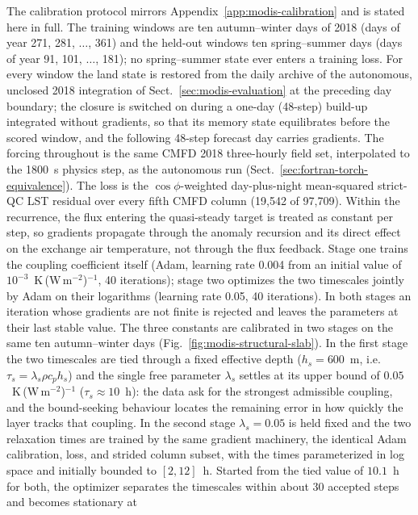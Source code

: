 The calibration protocol mirrors Appendix~\ref{app:modis-calibration} and
is stated here in full. The training windows are ten autumn--winter days of
2018 (days of year 271, 281, $\dots$, 361) and the held-out windows ten
spring--summer days (days of year 91, 101, $\dots$, 181); no
spring--summer state ever enters a training loss. For every window the land
state is restored from the daily archive of the autonomous, unclosed 2018
integration of Sect.~\ref{sec:modis-evaluation} at the preceding day
boundary; the closure is switched on during a one-day (48-step) build-up
integrated without gradients, so that its memory state equilibrates before
the scored window, and the following 48-step forecast day carries
gradients. The forcing throughout is the same CMFD 2018 three-hourly
field set, interpolated to the 1800~s physics step, as the autonomous run
(Sect.~\ref{sec:fortran-torch-equivalence}). The loss is the
$\cos\phi$-weighted day-plus-night mean-squared strict-QC LST residual over
every fifth CMFD column (19{,}542 of 97{,}709). Within the recurrence, the
flux entering the quasi-steady target is treated as constant per step, so
gradients propagate through the anomaly recursion and its direct effect on
the exchange air temperature, not through the flux feedback. Stage one
trains the coupling coefficient itself (Adam, learning rate 0.004 from an
initial value of $10^{-3}$~K\,(W\,m$^{-2}$)$^{-1}$, 40 iterations); stage
two optimizes the two timescales jointly by Adam on their logarithms
(learning rate 0.05, 40 iterations). In both stages an
iteration whose gradients are not finite is rejected and leaves the
parameters at their last stable value. The
three constants are calibrated
in two stages on the same ten autumn--winter days
(Fig.~\ref{fig:modis-structural-slab}). In the first stage the
two timescales are tied through a fixed effective depth ($h_s = 600$~m,
i.e.\ $\tau_s = \lambda_s \rho c_p h_s$) and the single free parameter
$\lambda_s$ settles at its upper bound of
$0.05$~K\,(W\,m$^{-2}$)$^{-1}$ ($\tau_s \approx 10$~h): the data ask for the
strongest admissible coupling, and the bound-seeking behaviour locates the
remaining error in how quickly the layer tracks that coupling. In the
second stage $\lambda_s = 0.05$ is held fixed and the two relaxation times
are trained by the same gradient machinery, the identical Adam
calibration, loss, and strided column subset, with the times
parameterized in log space and initially bounded to $[2,12]$~h. Started
from the tied value of $10.1$~h for both, the optimizer separates the
timescales within about 30 accepted steps and becomes stationary at
